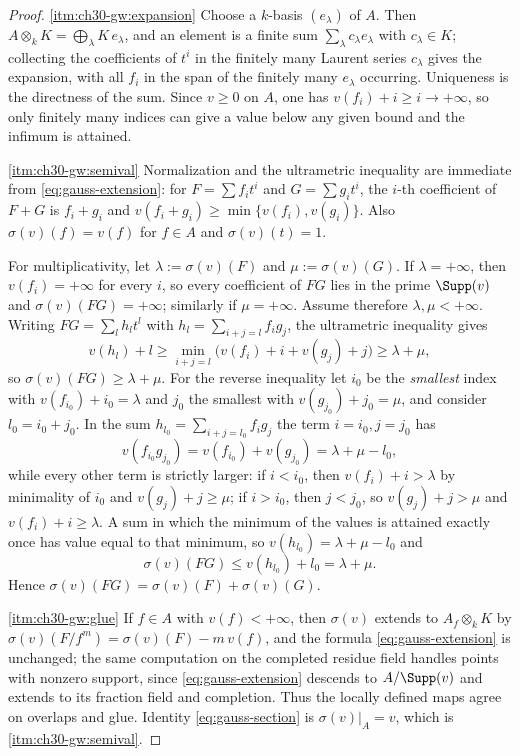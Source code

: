 \begin{proof}
\cref{itm:ch30-gw:expansion}  Choose a \(k\)-basis \((e_\lambda)\) of \(A\).
Then \(A\otimes_kK=\bigoplus_\lambda K\,e_\lambda\), and an element is a
finite sum \(\sum_\lambda c_\lambda e_\lambda\) with
\(c_\lambda\in K\); collecting the coefficients of \(t^i\) in the finitely
many Laurent series \(c_\lambda\) gives the expansion, with all \(f_i\) in
the span of the finitely many \(e_\lambda\) occurring.  Uniqueness is the
directness of the sum.  Since \(v\geq0\) on \(A\), one has
\(v(f_i)+i\geq i\to+\infty\), so only finitely many indices can give a value
below any given bound and the infimum is attained.

\cref{itm:ch30-gw:semival}  Normalization and the ultrametric inequality are
immediate from \eqref{eq:gauss-extension}: for \(F=\sum f_it^i\) and
\(G=\sum g_it^i\), the \(i\)-th coefficient of \(F+G\) is \(f_i+g_i\) and
\(v(f_i+g_i)\geq\min\{v(f_i),v(g_i)\}\).  Also
\(\sigma(v)(f)=v(f)\) for \(f\in A\) and \(\sigma(v)(t)=1\).

For multiplicativity, let \(\lambda:=\sigma(v)(F)\) and
\(\mu:=\sigma(v)(G)\).  If \(\lambda=+\infty\), then \(v(f_i)=+\infty\) for
every \(i\), so every coefficient of \(FG\) lies in the prime
\(\Supp(v)\) and \(\sigma(v)(FG)=+\infty\); similarly if
\(\mu=+\infty\).  Assume therefore \(\lambda,\mu<+\infty\).  Writing
\(FG=\sum_lh_lt^l\) with \(h_l=\sum_{i+j=l}f_ig_j\), the ultrametric
inequality gives
\[
 v(h_l)+l\geq\min_{i+j=l}\bigl(v(f_i)+i+v(g_j)+j\bigr)\geq\lambda+\mu,
\]
so \(\sigma(v)(FG)\geq\lambda+\mu\).  For the reverse inequality let
\(i_0\) be the \emph{smallest} index with \(v(f_{i_0})+i_0=\lambda\) and
\(j_0\) the smallest with \(v(g_{j_0})+j_0=\mu\), and consider
\(l_0=i_0+j_0\).  In the sum \(h_{l_0}=\sum_{i+j=l_0}f_ig_j\) the term
\(i=i_0,j=j_0\) has
\[
 v(f_{i_0}g_{j_0})=v(f_{i_0})+v(g_{j_0})=\lambda+\mu-l_0 ,
\]
while every other term is strictly larger: if \(i<i_0\), then
\(v(f_i)+i>\lambda\) by minimality of \(i_0\) and \(v(g_j)+j\geq\mu\); if
\(i>i_0\), then \(j<j_0\), so \(v(g_j)+j>\mu\) and \(v(f_i)+i\geq\lambda\).
A sum in which the minimum of the values is attained exactly once has value
equal to that minimum, so \(v(h_{l_0})=\lambda+\mu-l_0\) and
\[
 \sigma(v)(FG)\leq v(h_{l_0})+l_0=\lambda+\mu .
\]
Hence \(\sigma(v)(FG)=\sigma(v)(F)+\sigma(v)(G)\).

\cref{itm:ch30-gw:glue}  If \(f\in A\) with \(v(f)<+\infty\), then
\(\sigma(v)\) extends to \(A_f\otimes_kK\) by
\(\sigma(v)(F/f^m)=\sigma(v)(F)-m\,v(f)\), and the formula
\eqref{eq:gauss-extension} is unchanged; the same computation on the
completed residue field handles points with nonzero support, since
\eqref{eq:gauss-extension} descends to \(A/\Supp(v)\) and extends to its
fraction field and completion.  Thus the locally defined maps agree on
overlaps and glue.  Identity \eqref{eq:gauss-section} is
\(\sigma(v)|_A=v\), which is
\cref{itm:ch30-gw:semival}.


\end{proof}
